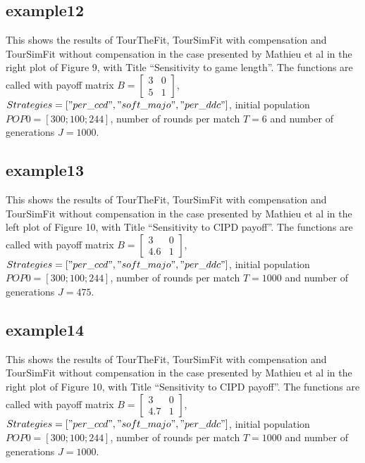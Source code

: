 \subsection{example12}
This shows the results of TourTheFit, TourSimFit with compensation and TourSimFit without compensation in the case presented by Mathieu et al in the right plot of Figure 9, with Title ``Sensitivity to game length''. The functions are called with payoff matrix $B = \begin{bmatrix} 3 & 0 \\ 5 & 1 \end{bmatrix}$, $Strategies = ["per\_ccd", "soft\_majo", "per\_ddc"]$, initial population $POP0 = [300; 100; 244]$, number of rounds per match $T = 6$ and number of generations $J = 1000$.

\subsection{example13}
This shows the results of TourTheFit, TourSimFit with compensation and TourSimFit without compensation in the case presented by Mathieu et al in the left plot of Figure 10, with Title ``Sensitivity to CIPD payoff''. The functions are called with payoff matrix $B = \begin{bmatrix} 3 & 0 \\ 4.6 & 1 \end{bmatrix}$, $Strategies = ["per\_ccd", "soft\_majo", "per\_ddc"]$, initial population $POP0 = [300; 100; 244]$, number of rounds per match $T = 1000$ and number of generations $J = 475$.

\subsection{example14}
This shows the results of TourTheFit, TourSimFit with compensation and TourSimFit without compensation in the case presented by Mathieu et al in the right plot of Figure 10, with Title ``Sensitivity to CIPD payoff''. The functions are called with payoff matrix $B = \begin{bmatrix} 3 & 0 \\ 4.7 & 1 \end{bmatrix}$, $Strategies = ["per\_ccd", "soft\_majo", "per\_ddc"]$, initial population $POP0 = [300; 100; 244]$, number of rounds per match $T = 1000$ and number of generations $J = 1000$.

